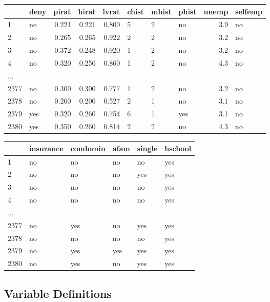 \documentclass[
  12pt,
  a4paper,
]{scrbook}
\theoremstyle{plain}
\theoremstyle{definition}
\theoremstyle{remark}
\begin{document}
\begingroup\small
\begin{adjustbox}{max width=\linewidth, center}
\begin{tabular}{llrrrlllrl}
\toprule
  & deny & pirat & hirat & lvrat & chist & mhist & phist & unemp & selfemp\\
\midrule
1 & no & 0.221 & 0.221 & 0.800 & 5 & 2 & no & 3.9 & no\\
2 & no & 0.265 & 0.265 & 0.922 & 2 & 2 & no & 3.2 & no\\
3 & no & 0.372 & 0.248 & 0.920 & 1 & 2 & no & 3.2 & no\\
4 & no & 0.320 & 0.250 & 0.860 & 1 & 2 & no & 4.3 & no\\
... &  &  &  &  &  &  &  &  & \\
2377 & no & 0.300 & 0.300 & 0.777 & 1 & 2 & no & 3.2 & no\\
2378 & no & 0.260 & 0.200 & 0.527 & 2 & 1 & no & 3.1 & no\\
2379 & yes & 0.320 & 0.260 & 0.754 & 6 & 1 & yes & 3.1 & no\\
2380 & yes & 0.350 & 0.260 & 0.814 & 2 & 2 & no & 4.3 & no\\
\bottomrule
\end{tabular}
\end{adjustbox}
\par\medskip
\begin{adjustbox}{max width=\linewidth, center}
\begin{tabular}{llllll}
\toprule
  & insurance & condomin & afam & single & hschool\\
\midrule
1 & no & no & no & no & yes\\
2 & no & no & no & yes & yes\\
3 & no & no & no & no & yes\\
4 & no & no & no & no & yes\\
... &  &  &  &  & \\
2377 & no & yes & no & yes & yes\\
2378 & no & no & no & no & yes\\
2379 & no & yes & yes & yes & yes\\
2380 & no & yes & no & yes & yes\\
\bottomrule
\end{tabular}
\end{adjustbox}
\endgroup

\subsection{Variable Definitions}\label{variable-definitions}
\end{document}
